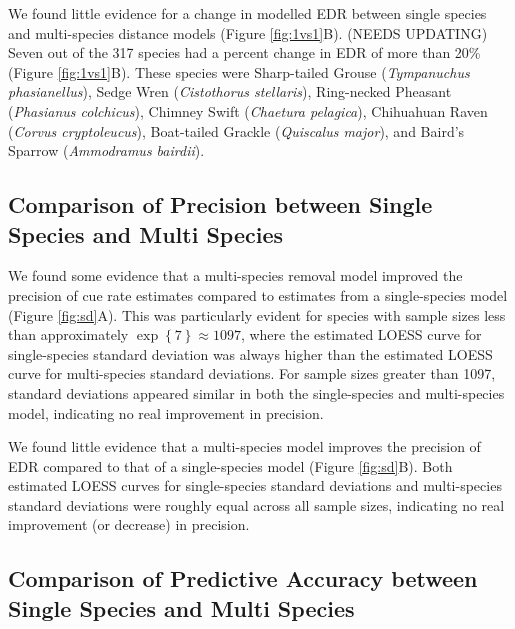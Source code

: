\documentclass[12pt]{article}
\begin{document}
\par We found little evidence for a change in modelled EDR between single species and multi-species distance models (Figure \ref{fig:1vs1}B). 
(NEEDS UPDATING) Seven out of the 317 species had a percent change in EDR of more than 20\% (Figure \ref{fig:1vs1}B).
These species were Sharp-tailed Grouse (\textit{Tympanuchus phasianellus}), Sedge Wren (\textit{Cistothorus stellaris}), Ring-necked Pheasant (\textit{Phasianus colchicus}), Chimney Swift (\textit{Chaetura pelagica}), Chihuahuan Raven (\textit{Corvus cryptoleucus}), Boat-tailed Grackle (\textit{Quiscalus major}), and Baird's Sparrow (\textit{Ammodramus bairdii}).

\subsection{Comparison of Precision between Single Species and Multi Species}

\par We found some evidence that a multi-species removal model improved the precision of cue rate estimates compared to estimates from a single-species model (Figure \ref{fig:sd}A).
This was particularly evident for species with sample sizes less than approximately $\exp\left\{7\right\} \approx 1097$, where the estimated LOESS curve for single-species standard deviation was always higher than the estimated LOESS curve for multi-species standard deviations.
For sample sizes greater than 1097, standard deviations appeared similar in both the single-species and multi-species model, indicating no real improvement in precision.

\par We found little evidence that a multi-species model improves the precision of EDR compared to that of a single-species model (Figure \ref{fig:sd}B).
Both estimated LOESS curves for single-species standard deviations and multi-species standard deviations were roughly equal across all sample sizes, indicating no real improvement (or decrease) in precision.

\subsection{Comparison of Predictive Accuracy between Single Species and Multi Species}
\end{document}
